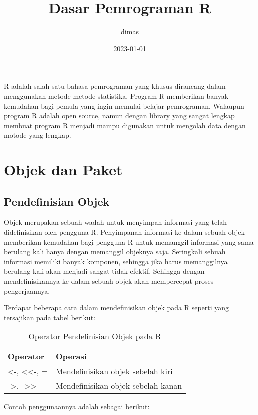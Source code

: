 \documentclass[
]{book}
\title{Dasar Pemrograman R}
\author{dimas}
\date{2023-01-01}
\begin{document}
\maketitle

{
\setcounter{tocdepth}{1}
\tableofcontents
}
R adalah salah satu bahasa pemrograman yang khusus dirancang dalam menggunakan metode-metode statistika. Program R memberikan banyak kemudahan bagi pemula yang ingin memulai belajar pemrograman. Walaupun program R adalah open source, namun dengan library yang sangat lengkap membuat program R menjadi mampu digunakan untuk mengolah data dengan motode yang lengkap.

\hypertarget{objek-dan-paket}{%
\chapter{Objek dan Paket}\label{objek-dan-paket}}

\hypertarget{pendefinisian-objek}{%
\section{Pendefinisian Objek}\label{pendefinisian-objek}}

Objek merupakan sebuah wadah untuk menyimpan informasi yang telah didefinisikan oleh pengguna R. Penyimpanan informasi ke dalam sebuah objek memberikan kemudahan bagi pengguna R untuk memanggil informasi yang sama berulang kali hanya dengan memanggil objeknya saja. Seringkali sebuah informasi memiliki banyak komponen, sehingga jika harus memanggilnya berulang kali akan menjadi sangat tidak efektif. Sehingga dengan mendefinisikannya ke dalam sebuah objek akan mempercepat proses pengerjaannya.

Terdapat beberapa cara dalam mendefinisikan objek pada R seperti yang tersajikan pada tabel berikut:

\begin{table}

\caption{\label{tab:unnamed-chunk-1}Operator Pendefinisian Objek pada R}
\centering
\begin{tabular}[t]{ll}
\toprule
Operator & Operasi\\
\midrule
<-, <<-, = & Mendefinisikan objek sebelah kiri\\
->, ->> & Mendefinisikan objek sebelah kanan\\
\bottomrule
\end{tabular}
\end{table}

Contoh penggunaannya adalah sebagai berikut:
\end{document}
